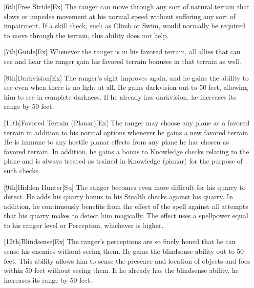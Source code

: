 [6th]{Free Stride}[Ex]
The ranger can move through any sort of natural terrain that slows or impedes movement at his normal speed without suffering any sort of impairment.
If a skill check, such as Climb or Swim, would normally be required to move through the terrain, this ability does not help.

[7th]{Guide}[Ex]
Whenever the ranger is in his favored terrain, all allies that can see and hear the ranger gain his favored terrain bonuses in that terrain as well.

[8th]{Darkvision}[Ex]
The ranger's sight improves again, and he gains the ability to see even when there is no light at all.
He gains darkvision out to 50 feet, allowing him to see in complete darkness.
If he already has darkvision, he increases its range by 50 feet.

[11th]{Favored Terrain (Planar)}[Ex]
The ranger may choose any plane as a favored terrain in addition to his normal options whenever he gains a new favored terrain.
He is immune to any hostile planar effects from any plane he has chosen as favored terrain.
In addition, he gains a  bonus to Knowledge checks relating to the plane and is always treated as trained in Knowledge (planar) for the purpose of such checks.

[9th]{Hidden Hunter}[Su]
The ranger becomes even more difficult for his quarry to detect.
He adds his quarry bonus to his Stealth checks against his quarry.
In addition, he continuously benefits from the effect of the  spell against all attempts that his quarry makes to detect him magically.
The effect uses a spellpower equal to his ranger level or Perception, whichever is higher.

[12th]{Blindsense}[Ex]
The ranger's perceptions are so finely honed that he can sense his enemies without seeing them.
He gains the blindsense ability out to 50 feet.
This ability allows him to sense the presence and location of objects and foes within 50 feet without seeing them.
If he already has the blindsense ability, he increases its range by 50 feet.

